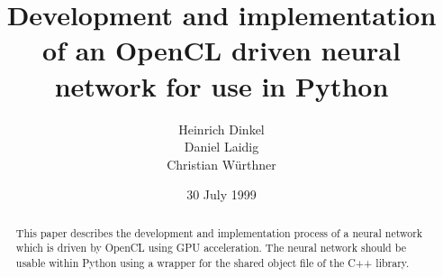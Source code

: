 \documentclass{acm_proc_article-sp}
\begin{document}
\title{Development and implementation of an OpenCL driven neural network for use in Python}
%
%
%
%
%

%
\author{
%
%
\alignauthor Heinrich Dinkel\\
\alignauthor Daniel Laidig\\
\alignauthor Christian Würthner\\
}

\date{30 July 1999}
\maketitle
\begin{abstract}
This paper describes the development and implementation process of a neural network which is driven by OpenCL using GPU acceleration. The neural network should be usable within Python using a wrapper for the shared object file of the C++ library.
\end{abstract}
\end{document}
